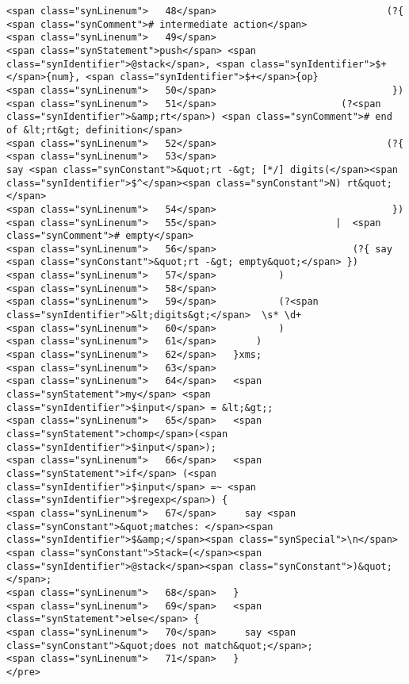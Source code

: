 \begin{verbatim}
<span class="synLinenum">   48</span>                              (?{  <span class="synComment"># intermediate action</span>
<span class="synLinenum">   49</span>                                   <span class="synStatement">push</span> <span class="synIdentifier">@stack</span>, <span class="synIdentifier">$+</span>{num}, <span class="synIdentifier">$+</span>{op}
<span class="synLinenum">   50</span>                               })
<span class="synLinenum">   51</span>                      (?<span class="synIdentifier">&amp;rt</span>) <span class="synComment"># end of &lt;rt&gt; definition</span>
<span class="synLinenum">   52</span>                              (?{
<span class="synLinenum">   53</span>                                   say <span class="synConstant">&quot;rt -&gt; [*/] digits(</span><span class="synIdentifier">$^</span><span class="synConstant">N) rt&quot;</span>
<span class="synLinenum">   54</span>                               })
<span class="synLinenum">   55</span>                     |  <span class="synComment"># empty</span>
<span class="synLinenum">   56</span>                        (?{ say <span class="synConstant">&quot;rt -&gt; empty&quot;</span> })
<span class="synLinenum">   57</span>           )
<span class="synLinenum">   58</span> 
<span class="synLinenum">   59</span>           (?<span class="synIdentifier">&lt;digits&gt;</span>  \s* \d+
<span class="synLinenum">   60</span>           )
<span class="synLinenum">   61</span>       )
<span class="synLinenum">   62</span>   }xms;
<span class="synLinenum">   63</span> 
<span class="synLinenum">   64</span>   <span class="synStatement">my</span> <span class="synIdentifier">$input</span> = &lt;&gt;;
<span class="synLinenum">   65</span>   <span class="synStatement">chomp</span>(<span class="synIdentifier">$input</span>);
<span class="synLinenum">   66</span>   <span class="synStatement">if</span> (<span class="synIdentifier">$input</span> =~ <span class="synIdentifier">$regexp</span>) {
<span class="synLinenum">   67</span>     say <span class="synConstant">&quot;matches: </span><span class="synIdentifier">$&amp;</span><span class="synSpecial">\n</span><span class="synConstant">Stack=(</span><span class="synIdentifier">@stack</span><span class="synConstant">)&quot;</span>;
<span class="synLinenum">   68</span>   }
<span class="synLinenum">   69</span>   <span class="synStatement">else</span> {
<span class="synLinenum">   70</span>     say <span class="synConstant">&quot;does not match&quot;</span>;
<span class="synLinenum">   71</span>   }
</pre>

\end{verbatim}

